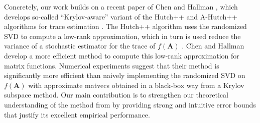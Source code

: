 Concretely, our work builds on a recent paper of
Chen and Hallman \cite{chen_hallman_23}, which develops so-called ``Krylov-aware'' variant of the Hutch++ and A-Hutch++ algorithms for trace estimation \cite{hpp,ahpp} .
The Hutch++ algorithm uses the randomized SVD to compute a low-rank approximation, which in turn is used reduce the variance of a stochastic estimator for the trace of $f(\bm{A})$ \cite{cortinoviskressner,ubarusaad,ubaru2017applications}. 
Chen and Hallman develop a more efficient method to compute this low-rank approximation for matrix functions.
Numerical experiments suggest that their method is significantly more efficient than naively implementing the randomized SVD on $f(\bm{A})$ with approximate matvecs obtained in a black-box way from a Krylov subspace method. 
Our main contribution is to strengthen our theoretical understanding of the method from \cite{chen_hallman_23} by providing strong and intuitive error bounds that justify its excellent empirical performance. %

